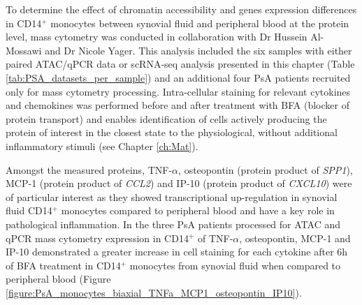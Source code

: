 To determine the effect of chromatin accessibility and genes expression differences in CD14$^+$ monocytes between synovial fluid and peripheral blood at the protein level, mass cytometry was conducted in collaboration with Dr Hussein Al-Mossawi and Dr Nicole Yager. This analysis included the six samples with either paired ATAC/qPCR data or scRNA-seq analysis presented in this chapter (Table \ref{tab:PSA_datasets_per_sample}) and an additional four PsA patients recruited only for mass cytometry processing. Intra-cellular staining for relevant cytokines and chemokines was performed before and after treatment with BFA (blocker of protein transport) and enables identification of cells actively producing the protein of interest in the closest state to the physiological, without additional inflammatory stimuli (see Chapter \ref{ch:Mat}).

Amongst the measured proteins, TNF-$\alpha$, osteopontin (protein product of \textit{SPP1}), MCP-1 (protein product of \textit{CCL2}) and IP-10 (protein product of \textit{CXCL10}) were of particular interest as they showed transcriptional up-regulation in synovial fluid CD14$^+$ monocytes compared to peripheral blood and have a key role in pathological inflammation. In the three PsA patients processed for ATAC and qPCR mass cytometry expression in CD14$^+$ of TNF-$\alpha$, osteopontin, MCP-1 and IP-10 demonstrated a greater increase in cell staining for each cytokine after 6h of BFA treatment in CD14$^+$ monocytes from synovial fluid when compared to peripheral blood (Figure \ref{figure:PsA_monocytes_biaxial_TNFa_MCP1_osteopontin_IP10}).



